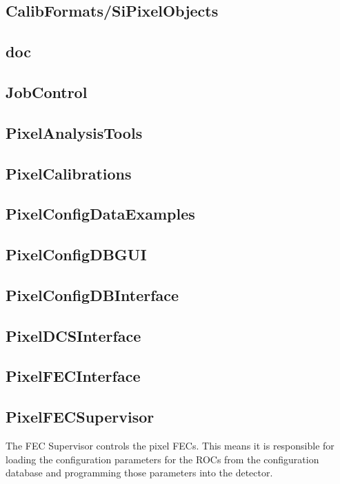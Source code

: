 \subsection{CalibFormats/SiPixelObjects}

\subsection{doc}

\subsection{JobControl}

\subsection{PixelAnalysisTools}

\subsection{PixelCalibrations}

\subsection{PixelConfigDataExamples}

\subsection{PixelConfigDBGUI}

\subsection{PixelConfigDBInterface}

\subsection{PixelDCSInterface}

\subsection{PixelFECInterface}

\subsection{PixelFECSupervisor}
The FEC Supervisor controls the pixel FECs. This means it is
responsible for loading the configuration parameters for the ROCs from
the configuration database and programming those parameters into the
detector.

